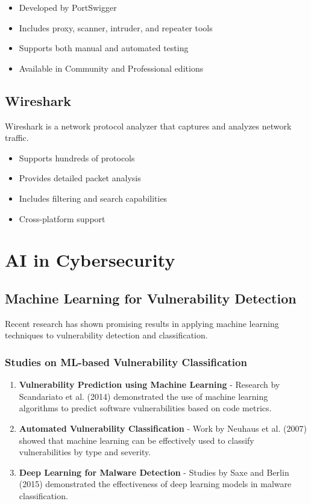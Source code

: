 \documentclass[12pt,a4paper]{report}
\begin{document}
\begin{itemize}
    \item Developed by PortSwigger
    \item Includes proxy, scanner, intruder, and repeater tools
    \item Supports both manual and automated testing
    \item Available in Community and Professional editions
\end{itemize}

\subsection{Wireshark}

Wireshark is a network protocol analyzer that captures and analyzes network traffic.

\begin{itemize}
    \item Supports hundreds of protocols
    \item Provides detailed packet analysis
    \item Includes filtering and search capabilities
    \item Cross-platform support
\end{itemize}

\section{AI in Cybersecurity}

\subsection{Machine Learning for Vulnerability Detection}

Recent research has shown promising results in applying machine learning techniques to vulnerability detection and classification.

\subsubsection{Studies on ML-based Vulnerability Classification}

\begin{enumerate}
    \item \textbf{Vulnerability Prediction using Machine Learning} - Research by Scandariato et al. (2014) demonstrated the use of machine learning algorithms to predict software vulnerabilities based on code metrics.
    
    \item \textbf{Automated Vulnerability Classification} - Work by Neuhaus et al. (2007) showed that machine learning can be effectively used to classify vulnerabilities by type and severity.
    
    \item \textbf{Deep Learning for Malware Detection} - Studies by Saxe and Berlin (2015) demonstrated the effectiveness of deep learning models in malware classification.
\end{enumerate}
\end{document}
